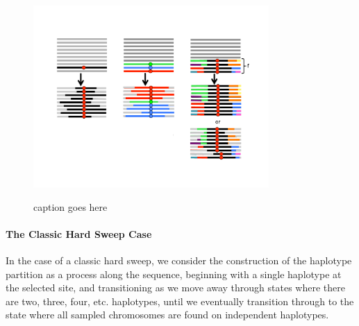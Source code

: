 \documentclass[a4paper,10pt]{article}
\newcommand{\jb}[1]{{\it\color{blue} (#1)} }
\begin{document}



\begin{figure}
	\includegraphics[width = 0.8\textwidth]{../Paper_Figures/three_kinds_of_sweep.pdf} \label{cartoon_3_kinds}
	\caption{caption goes here}
\end{figure}


\paragraph{The Classic Hard Sweep Case}
In the case of a classic hard sweep, we consider the construction of the haplotype partition as a process along the sequence, beginning with a single haplotype at the selected site, and transitioning as we move away through states where there are two, three, four, etc. haplotypes, until we eventually transition through to the state where all sampled chromosomes are found on independent haplotypes. 
\end{document}

